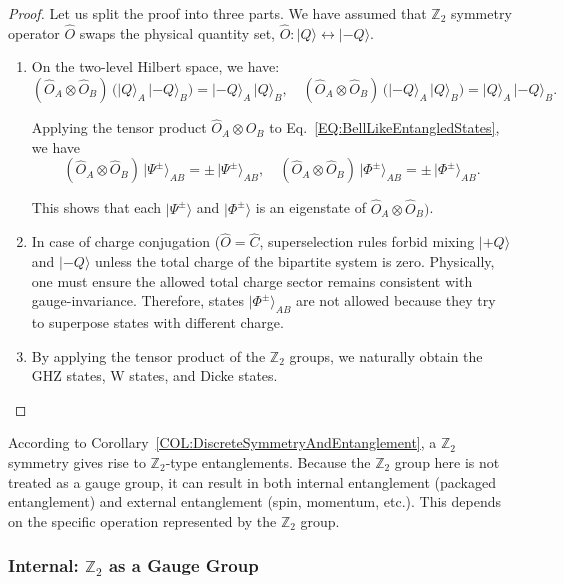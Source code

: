 \documentclass[12pt,a4paper]{article}
\begin{document}
\begin{proof}
	Let us split the proof into three parts.
	We have assumed that $\mathbb{Z}_{2}$ symmetry operator $\hat{O}$ swaps the physical quantity set, $\hat{O}: \lvert Q\rangle\leftrightarrow \lvert -Q\rangle$.
	\begin{enumerate}
		\item On the two-level Hilbert space, we have:
		\[
		(\hat{O}_A \otimes \hat{O}_B)\,\bigl(\lvert Q\rangle_A \,\lvert -Q\rangle_B\bigr)
		= \lvert -Q\rangle_A \,\lvert Q\rangle_B,
		\quad
		(\hat{O}_A \otimes \hat{O}_B)\,\bigl(\lvert -Q\rangle_A \,\lvert Q\rangle_B\bigr)
		= \lvert Q\rangle_A \,\lvert -Q\rangle_B.
		\]
		
		Applying the tensor product $\hat{O}_A \otimes \hat{O}_B$ to Eq.~\eqref{EQ:BellLikeEntangledStates}, we have
		\[
		(\hat{O}_A \otimes \hat{O}_B)\,\lvert \Psi^\pm\rangle_{AB}
		= \pm\,\lvert \Psi^\pm\rangle_{AB},
		\quad
		(\hat{O}_A \otimes \hat{O}_B)\,\lvert \Phi^\pm\rangle_{AB}
		= \pm\,\lvert \Phi^\pm\rangle_{AB}.
		\]
		
		This shows that each $\lvert \Psi^\pm\rangle$ and $\lvert \Phi^\pm\rangle$ is an eigenstate of $\hat{O}_A \otimes \hat{O}_B)$.
		
		\item In case of charge conjugation ($\hat{O} = \hat{C}$, superselection rules forbid mixing $\lvert +Q\rangle$ and $\lvert -Q\rangle$ unless the total charge of the bipartite system is zero.
		Physically, one must ensure the allowed total charge sector remains consistent with gauge-invariance.
		Therefore, states $\lvert \Phi^{\pm} \rangle_{AB}$ are not allowed because they try to superpose states with different charge.
		
		\item By applying the tensor product of the $\mathbb{Z}_{2}$ groups, we naturally obtain the GHZ states, W states, and Dicke states.
	\end{enumerate}
\end{proof}


According to Corollary~\ref{COL:DiscreteSymmetryAndEntanglement}, a $\mathbb{Z}_2$ symmetry gives rise to $\mathbb{Z}_2$-type entanglements.
Because the $\mathbb{Z}_2$ group here is not treated as a gauge group, it can result in both internal entanglement (packaged entanglement) and external entanglement (spin, momentum, etc.).
This depends on the specific operation represented by the $\mathbb{Z}_2$ group.



\subsubsection{Internal: $\mathbb{Z}_2$ as a Gauge Group}
\end{document}
